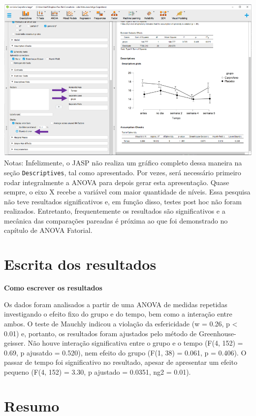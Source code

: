 \documentclass[
]{book}
\begin{document}
\includegraphics{./img/cap_anovarm_grafico.png} Notas: Infelizmente, o
JASP não realiza um gráfico completo dessa maneira na seção
\texttt{Descriptives}, tal como apresentado. Por vezes, será necessário
primeiro rodar integralmente a ANOVA para depois gerar esta
apresentação. Quase sempre, o eixo X recebe a variável com maior
quantidade de níveis. Essa pesquisa não teve resultados significativos
e, em função disso, testes post hoc não foram realizados. Entretanto,
frequentemente os resultados são significativos e a mecânica das
comparações pareadas é próxima ao que foi demonstrado no capítulo de
ANOVA Fatorial.

\hypertarget{escrita-dos-resultados-9}{%
\section{Escrita dos resultados}\label{escrita-dos-resultados-9}}

\begin{writing}
\textbf{Como escrever os resultados}

Os dados foram analisados a partir de uma ANOVA de medidas repetidas
investigando o efeito fixo do grupo e do tempo, bem como a interação
entre ambos. O teste de Mauchly indicou a violação da esfericidade (w =
0.26, p \textless{} 0.01) e, portanto, os resultados foram ajustados
pelo método de Greenhouse-geisser. Não houve interação significativa
entre o grupo e o tempo (F(4, 152) = 0.69, p ajusatdo = 0.520), nem
efeito do grupo (F(1, 38) = 0.061, p = 0.406). O passar de tempo foi
significativo no resultado, apesar de apresentar um efeito pequeno (F(4,
152) = 3.30, p ajustado = 0.0351, ng2 = 0.01).
\end{writing}

\hypertarget{resumo-9}{%
\section{Resumo}\label{resumo-9}}
\end{document}
